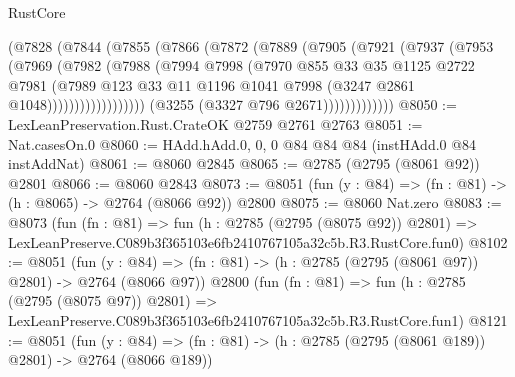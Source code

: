 \begin{lexlean}{RustCore}
\begin{coremodule}
                            (@7828
                              (@7844
                                (@7855
                                  (@7866
                                    (@7872
                                      (@7889
                                        (@7905
                                          (@7921
                                            (@7937
                                              (@7953
                                                (@7969
                                                  (@7982
                                                    (@7988
                                                      (@7994
                                                        @7998
                                                        (@7970
                                                          @855
                                                          @33
                                                          @35
                                                          @1125
                                                          @2722
                                                          @7981
                                                          (@7989
                                                            @123
                                                            @33
                                                            @11
                                                            @1196
                                                            @1041
                                                            @7998
                                                            (@3247 @2861 @1048))))))))))))))))))
                          (@3255 (@3327 @796 @2671)))))))))))))
@8050 := LexLeanPreservation.Rust.CrateOK @2759 @2761 @2763
@8051 := Nat.casesOn.{0}
@8060 := HAdd.hAdd.{0, 0, 0} @84 @84 @84 (instHAdd.{0} @84 instAddNat)
@8061 := @8060 @2845
@8065 := @2785 (@2795 (@8061 @92)) @2801
@8066 := @8060 @2843
@8073 := @8051 (fun (y : @84) => (fn : @81) -> (h : @8065) -> @2764 (@8066 @92)) @2800
@8075 := @8060 Nat.zero
@8083 := @8073
    (fun (fn : @81) =>
    fun (h : @2785 (@2795 (@8075 @92)) @2801) =>
    LexLeanPreserve.C089b3f365103e6fb2410767105a32c5b.R3.RustCore.fun0)
@8102 := @8051
    (fun (y : @84) => (fn : @81) -> (h : @2785 (@2795 (@8061 @97)) @2801) -> @2764 (@8066 @97))
    @2800
    (fun (fn : @81) =>
    fun (h : @2785 (@2795 (@8075 @97)) @2801) =>
    LexLeanPreserve.C089b3f365103e6fb2410767105a32c5b.R3.RustCore.fun1)
@8121 := @8051
    (fun (y : @84) => (fn : @81) -> (h : @2785 (@2795 (@8061 @189)) @2801) -> @2764 (@8066 @189))

\end{coremodule}
\end{lexlean}
